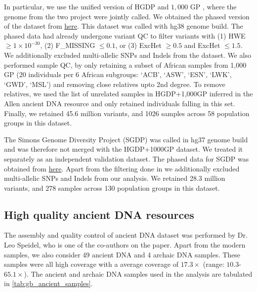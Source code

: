In particular, we use the unified version of HGDP and $1{,}000$ GP \cite{koenig2024harmonized}, where the genome from the two project were jointly called. 
%
We obtained the phased version of the dataset from \href{gs://gcp-public-data‐‐gnomad/resources/hgdp_1kg/phased_haplotypes_v2/}{here}. This dataset was called with hg38 genome build.
%
The phased data had already undergone variant QC to filter variants with (1) HWE $\geq 1 \times 10^{-30}$, (2) F\_MISSING $\leq 0.1$, or (3) ExcHet $\geq 0.5$ and ExcHet $\leq 1.5$. 
%
We additionally excluded multi-allelic SNPs and Indels from the dataset.
%
We also performed sample QC, by only retaining a subset of African samples from 1,000 GP (20 individuals per 6 African subgroups: `ACB', `ASW', `ESN', `LWK', `GWD', `MSL') and removing close relatives upto 2nd degree.
%
To remove relatives, we used the list of unrelated samples in HGDP+1,000GP inferred in the Allen ancient DNA resource \cite{mallick2024allen} and only retained individuals falling in this set.
%
Finally, we retained 45.6 million variants, and 1026 samples across 58 population groups in this dataset. 


The Simons Genome Diversity Project (SGDP) was called in hg37 genome build and was therefore not merged with the HGDP+1000GP dataset. 
%
We treated it separately as an independent validation dataset.
%
The phased data for SGDP was obtained from \href{https://sharehost.hms.harvard.edu/genetics/reich_lab/sgdp/phased_data.knownbugs.not_recommended.please_use_newer_dataset_instead/}{here}. 
%
Apart from the filtering done in \cite{mallick2016simons} we additionally excluded multi-allelic SNPs and Indels from our analysis. 
%
We retained 28.3 million variants, and 278 samples across 130 population groups in this dataset.

\subsection{High quality ancient DNA resources}

The assembly and quality control of ancient DNA dataset was performed by Dr. Leo Speidel, who is one of the co-authors on the paper.
%
Apart from the modern samples, we also consider 49 ancient DNA and 4 archaic DNA samples. These samples were all high coverage with a average coverage of $17.3\times$ (range: $10.3$-$65.1 \times$). The ancient and archaic DNA samples used in the analysis are tabulated in \ref{tab:gb_ancient_samples}.

